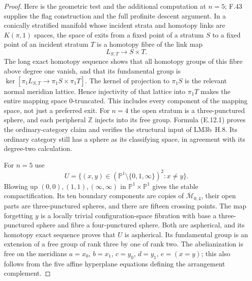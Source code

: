 \begin{proof}
Here is the geometric test and the additional computation at $n=5$; F.43 supplies the flag construction and the full profinite descent argument. In a conically stratified manifold whose incident strata and homotopy links are $K(\pi,1)$ spaces, the space of exits from a fixed point of a stratum $S$ to a fixed point of an incident stratum $T$ is a homotopy fibre of the link map
\[
 L_{S,T}\longrightarrow S\times T.
                                                        \tag{E.12.1}
\]
The long exact homotopy sequence shows that all homotopy groups of this fibre above degree one vanish, and that its fundamental group is
$\ker[\pi_1L_{S,T}\to\pi_1S\times\pi_1T]$.
The kernel of projection to $\pi_1S$ is the relevant normal meridian lattice. Hence injectivity of that lattice into $\pi_1T$ makes the entire mapping space $0$-truncated. This includes every component of the mapping space, not just a preferred exit. For $n=4$ the open stratum is a three-punctured sphere, and each peripheral $\mathbb Z$ injects into its free group. Formula (E.12.1) proves the ordinary-category claim and verifies the structural input of LM3b~H.8. Its ordinary category still has a sphere as its classifying space, in agreement with its degree-two calculation.

For $n=5$ use
\[
 U=\{(x,y)\in(\mathbb P^1\setminus\{0,1,\infty\})^2:x\ne y\}.
\]
Blowing up $(0,0),(1,1),(\infty,\infty)$ in $\mathbb P^1\times\mathbb P^1$ gives the stable compactification. Its ten boundary components are copies of $\overline{\mathcal M}_{0,4}$, their open parts are three-punctured spheres, and there are fifteen crossing points. The map forgetting $y$ is a locally trivial configuration-space fibration with base a three-punctured sphere and fibre a four-punctured sphere. Both are aspherical, and its homotopy exact sequence proves that $U$ is aspherical. Its fundamental group is an extension of a free group of rank three by one of rank two. The abelianization is free on the meridians $a=x_0$, $b=x_1$, $c=y_0$, $d=y_1$, $e=(x=y)$; this also follows from the five affine hyperplane equations defining the arrangement complement.


\end{proof}
